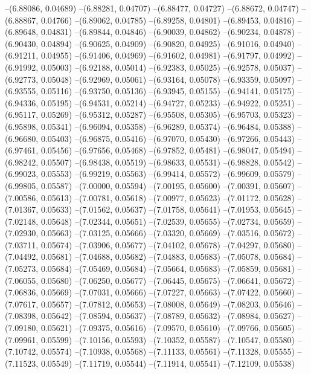 --(6.88086, 0.04689)
--(6.88281, 0.04707)
--(6.88477, 0.04727)
--(6.88672, 0.04747)
--(6.88867, 0.04766)
--(6.89062, 0.04785)
--(6.89258, 0.04801)
--(6.89453, 0.04816)
--(6.89648, 0.04831)
--(6.89844, 0.04846)
--(6.90039, 0.04862)
--(6.90234, 0.04878)
--(6.90430, 0.04894)
--(6.90625, 0.04909)
--(6.90820, 0.04925)
--(6.91016, 0.04940)
--(6.91211, 0.04955)
--(6.91406, 0.04969)
--(6.91602, 0.04981)
--(6.91797, 0.04992)
--(6.91992, 0.05003)
--(6.92188, 0.05014)
--(6.92383, 0.05025)
--(6.92578, 0.05037)
--(6.92773, 0.05048)
--(6.92969, 0.05061)
--(6.93164, 0.05078)
--(6.93359, 0.05097)
--(6.93555, 0.05116)
--(6.93750, 0.05136)
--(6.93945, 0.05155)
--(6.94141, 0.05175)
--(6.94336, 0.05195)
--(6.94531, 0.05214)
--(6.94727, 0.05233)
--(6.94922, 0.05251)
--(6.95117, 0.05269)
--(6.95312, 0.05287)
--(6.95508, 0.05305)
--(6.95703, 0.05323)
--(6.95898, 0.05341)
--(6.96094, 0.05358)
--(6.96289, 0.05374)
--(6.96484, 0.05388)
--(6.96680, 0.05403)
--(6.96875, 0.05416)
--(6.97070, 0.05430)
--(6.97266, 0.05443)
--(6.97461, 0.05456)
--(6.97656, 0.05468)
--(6.97852, 0.05481)
--(6.98047, 0.05494)
--(6.98242, 0.05507)
--(6.98438, 0.05519)
--(6.98633, 0.05531)
--(6.98828, 0.05542)
--(6.99023, 0.05553)
--(6.99219, 0.05563)
--(6.99414, 0.05572)
--(6.99609, 0.05579)
--(6.99805, 0.05587)
--(7.00000, 0.05594)
--(7.00195, 0.05600)
--(7.00391, 0.05607)
--(7.00586, 0.05613)
--(7.00781, 0.05618)
--(7.00977, 0.05623)
--(7.01172, 0.05628)
--(7.01367, 0.05633)
--(7.01562, 0.05637)
--(7.01758, 0.05641)
--(7.01953, 0.05645)
--(7.02148, 0.05648)
--(7.02344, 0.05651)
--(7.02539, 0.05655)
--(7.02734, 0.05659)
--(7.02930, 0.05663)
--(7.03125, 0.05666)
--(7.03320, 0.05669)
--(7.03516, 0.05672)
--(7.03711, 0.05674)
--(7.03906, 0.05677)
--(7.04102, 0.05678)
--(7.04297, 0.05680)
--(7.04492, 0.05681)
--(7.04688, 0.05682)
--(7.04883, 0.05683)
--(7.05078, 0.05684)
--(7.05273, 0.05684)
--(7.05469, 0.05684)
--(7.05664, 0.05683)
--(7.05859, 0.05681)
--(7.06055, 0.05680)
--(7.06250, 0.05677)
--(7.06445, 0.05675)
--(7.06641, 0.05672)
--(7.06836, 0.05669)
--(7.07031, 0.05666)
--(7.07227, 0.05663)
--(7.07422, 0.05660)
--(7.07617, 0.05657)
--(7.07812, 0.05653)
--(7.08008, 0.05649)
--(7.08203, 0.05646)
--(7.08398, 0.05642)
--(7.08594, 0.05637)
--(7.08789, 0.05632)
--(7.08984, 0.05627)
--(7.09180, 0.05621)
--(7.09375, 0.05616)
--(7.09570, 0.05610)
--(7.09766, 0.05605)
--(7.09961, 0.05599)
--(7.10156, 0.05593)
--(7.10352, 0.05587)
--(7.10547, 0.05580)
--(7.10742, 0.05574)
--(7.10938, 0.05568)
--(7.11133, 0.05561)
--(7.11328, 0.05555)
--(7.11523, 0.05549)
--(7.11719, 0.05544)
--(7.11914, 0.05541)
--(7.12109, 0.05538)

